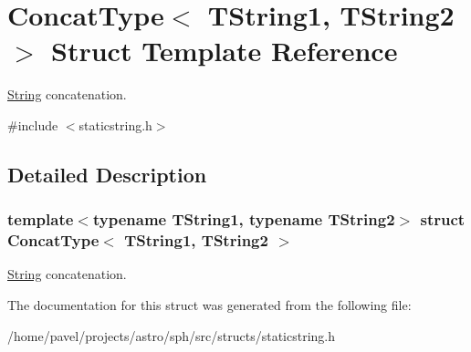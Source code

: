 \hypertarget{structConcatType}{}\section{Concat\+Type$<$ T\+String1, T\+String2 $>$ Struct Template Reference}
\label{structConcatType}


\hyperlink{classString}{String} concatenation.  




{\ttfamily \#include $<$staticstring.\+h$>$}



\subsection{Detailed Description}
\subsubsection*{template$<$typename T\+String1, typename T\+String2$>$\newline
struct Concat\+Type$<$ T\+String1, T\+String2 $>$}

\hyperlink{classString}{String} concatenation. 

The documentation for this struct was generated from the following file\+:\begin{DoxyCompactItemize}
\item 
/home/pavel/projects/astro/sph/src/structs/staticstring.\+h\end{DoxyCompactItemize}
